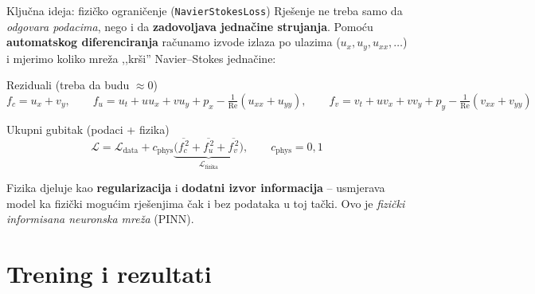 \documentclass[10pt,aspectratio=169]{beamer}
\begin{document}
\begin{frame}{Ključna ideja: fizičko ograničenje (\texttt{NavierStokesLoss})}
  \small
  Rješenje ne treba samo da \emph{odgovara podacima}, nego i da \textbf{zadovoljava jednačine strujanja}.
  Pomoću \textbf{automatskog diferenciranja} računamo izvode izlaza po ulazima
  ($u_x, u_y, u_{xx}, \dots$) i mjerimo koliko mreža ,,krši'' Navier--Stokes jednačine:
  \vfill
  \begin{block}{Reziduali (treba da budu $\approx 0$)}
    \[
      f_c = u_x + v_y, \qquad
      f_u = u_t + u u_x + v u_y + p_x - \tfrac{1}{\mathrm{Re}}(u_{xx}+u_{yy}), \qquad
      f_v = v_t + u v_x + v v_y + p_y - \tfrac{1}{\mathrm{Re}}(v_{xx}+v_{yy})
    \]
  \end{block}
  \begin{block}{Ukupni gubitak (podaci + fizika)}
    \[
      \mathcal{L} = \mathcal{L}_{\text{data}}
      + c_{\text{phys}}\underbrace{\Big(\overline{f_c^{\,2}} + \overline{f_u^{\,2}} + \overline{f_v^{\,2}}\Big)}_{\mathcal{L}_{\text{fizika}}},
      \qquad c_{\text{phys}} = 0{,}1
    \]
  \end{block}
  \vfill
  Fizika djeluje kao \textbf{regularizacija} i \textbf{dodatni izvor informacija} --
  usmjerava model ka fizički mogućim rješenjima čak i bez podataka u toj tački.
  Ovo je \emph{fizički informisana neuronska mreža} (PINN).
\end{frame}

\section{Trening i rezultati}
\end{document}
